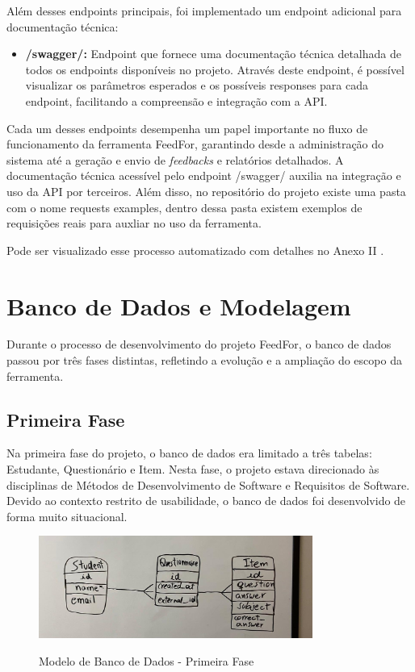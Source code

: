 Além desses endpoints principais, foi implementado um endpoint adicional para documentação técnica:

\begin{itemize}
    \item \textbf{/swagger/:} Endpoint que fornece uma documentação técnica detalhada de todos os endpoints disponíveis no projeto. Através deste endpoint, é possível visualizar os parâmetros esperados e os possíveis responses para cada endpoint, facilitando a compreensão e integração com a API.
\end{itemize}

Cada um desses endpoints desempenha um papel importante no fluxo de funcionamento da ferramenta FeedFor, garantindo desde a administração do sistema até a geração e envio de \textit{feedbacks} e relatórios detalhados. A documentação técnica acessível pelo endpoint /swagger/ auxilia na integração e uso da API por terceiros. Além disso, no repositório do projeto existe uma pasta com o nome requests examples, dentro dessa pasta existem exemplos de requisições reais para auxliar no uso da ferramenta.

Pode ser visualizado esse processo automatizado com detalhes no Anexo II .

\section{Banco de Dados e Modelagem}

Durante o processo de desenvolvimento do projeto FeedFor, o banco de dados passou por três fases distintas, refletindo a evolução e a ampliação do escopo da ferramenta.

\subsection{Primeira Fase}

Na primeira fase do projeto, o banco de dados era limitado a três tabelas: Estudante, Questionário e Item. Nesta fase, o projeto estava direcionado às disciplinas de Métodos de Desenvolvimento de Software e Requisitos de Software. Devido ao contexto restrito de usabilidade, o banco de dados foi desenvolvido de forma muito situacional.

\begin{figure}[H]
    \centering
    \caption{Modelo de Banco de Dados - Primeira Fase}
    \includegraphics[width=0.8\textwidth]{figuras/bd-phase1.jpeg}
    \label{fig:first_phase}
\end{figure}

